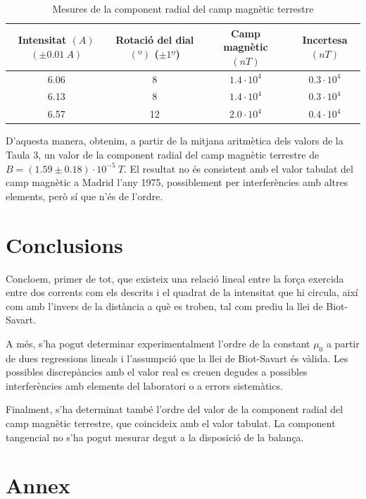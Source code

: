 \begin{table}
	\centering
	\caption{Mesures de la component radial del camp magnètic terrestre}
	\vspace{0.5cm}
	\begin{tabular}{|c|c|c|c|}
		\hline
		\textbf{Intensitat} $\si{(A)}$ $(\pm0.01\ \si{A})$&\textbf{Rotació del dial} $\si{(º)}$ ($\pm 1º$)&\textbf{Camp magnètic} $\si{(nT)}$ & \textbf{Incertesa} $\si{(nT)}$\\ \hline
		6.06 & 8 &$1.4\cdot10^{4}$ & $0.3\cdot10^{4}$ \\ \hline
		6.13 & 8  &$1.4\cdot10^{4}$  &$0.3\cdot10^{4}$ \\ \hline 
		6.57 & 12 &$2.0\cdot10^{4}$  &$0.4\cdot10^{4}$ \\ \hline 

	\end{tabular}
\end{table}
D'aquesta manera, obtenim, a partir de la mitjana aritmètica dels valors de la Taula 3, un valor de la component radial del camp magnètic terrestre de $B=(1.59\pm0.18)\cdot10^{-5}\ \si{T}$. El resultat no és consistent amb el valor tabulat del camp magnètic a Madrid l'any 1975, possiblement per interferències amb altres elements, però sí que n'és de l'ordre.

\section{Conclusions}
Concloem, primer de tot, que existeix una relació lineal entre la força exercida entre dos corrents com els descrits i el quadrat de la intensitat que hi circula, així com amb l'invers de la distància a què es troben, tal com prediu la llei de Biot-Savart.

A més, s'ha pogut determinar experimentalment l'ordre de la constant $\mu_0$ a partir de dues regressions lineals i l'assumpció que la llei de Biot-Savart és vàlida. Les possibles discrepàncies amb el valor real es creuen degudes a possibles interferències amb elements del laboratori o a errors sistemàtics.

Finalment, s'ha determinat també l'ordre del valor de la component radial del camp magnètic terrestre, que coincideix amb el valor tabulat. La component tangencial no s'ha pogut mesurar degut a la disposició de la balança.


\section*{Annex}

